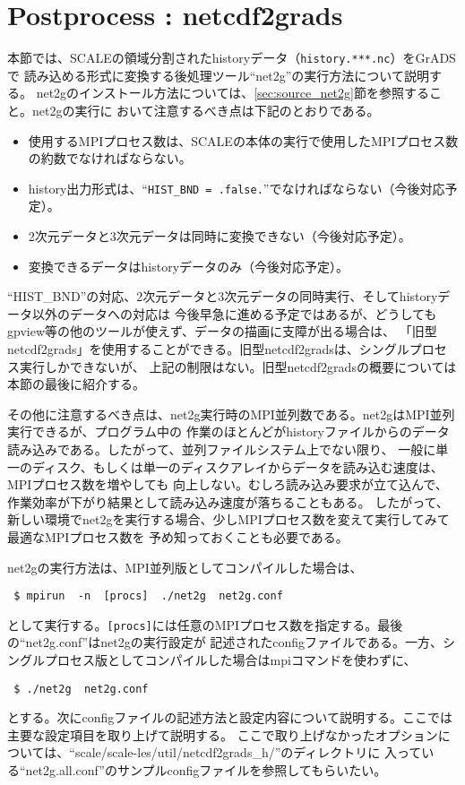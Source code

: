 \section{Postprocess : netcdf2grads}
\label{sec:net2g}

本節では、SCALEの領域分割されたhistoryデータ（\verb|history.***.nc|）をGrADSで
読み込める形式に変換する後処理ツール``net2g''の実行方法について説明する。
net2gのインストール方法については、\ref{sec:source_net2g}節を参照すること。net2gの実行に
おいて注意するべき点は下記のとおりである。

\begin{itemize}
 \item 使用するMPIプロセス数は、SCALEの本体の実行で使用したMPIプロセス数の約数でなければならない。
 \item history出力形式は、``\verb|HIST_BND = .false.|''でなければならない（今後対応予定）。
 \item 2次元データと3次元データは同時に変換できない（今後対応予定）。
 \item 変換できるデータはhistoryデータのみ（今後対応予定）。
\end{itemize}

``HIST\_BND''の対応、2次元データと3次元データの同時実行、そしてhistoryデータ以外のデータへの対応は
今後早急に進める予定ではあるが、どうしてもgpview等の他のツールが使えず、データの描画に支障が出る場合は、
「旧型netcdf2grads」を使用することができる。旧型netcdf2gradsは、シングルプロセス実行しかできないが、
上記の制限はない。旧型netcdf2gradsの概要については本節の最後に紹介する。

その他に注意するべき点は、net2g実行時のMPI並列数である。net2gはMPI並列実行できるが、プログラム中の
作業のほとんどがhistoryファイルからのデータ読み込みである。したがって、並列ファイルシステム上でない限り、
一般に単一のディスク、もしくは単一のディスクアレイからデータを読み込む速度は、MPIプロセス数を増やしても
向上しない。むしろ読み込み要求が立て込んで、作業効率が下がり結果として読み込み速度が落ちることもある。
したがって、新しい環境でnet2gを実行する場合、少しMPIプロセス数を変えて実行してみて最適なMPIプロセス数を
予め知っておくことも必要である。

net2gの実行方法は、MPI並列版としてコンパイルした場合は、
\begin{verbatim}
 $ mpirun  -n  [procs]  ./net2g  net2g.conf
\end{verbatim}
として実行する。\verb|[procs]|には任意のMPIプロセス数を指定する。最後の``net2g.conf''はnet2gの実行設定が
記述されたconfigファイルである。一方、シングルプロセス版としてコンパイルした場合はmpiコマンドを使わずに、
\begin{verbatim}
 $ ./net2g  net2g.conf
\end{verbatim}
とする。次にconfigファイルの記述方法と設定内容について説明する。ここでは主要な設定項目を取り上げて説明する。
ここで取り上げなかったオプションについては、``scale/scale-les/util/netcdf2grads\_h/''のディレクトリに
入っている``net2g.all.conf''のサンプルconfigファイルを参照してもらいたい。

